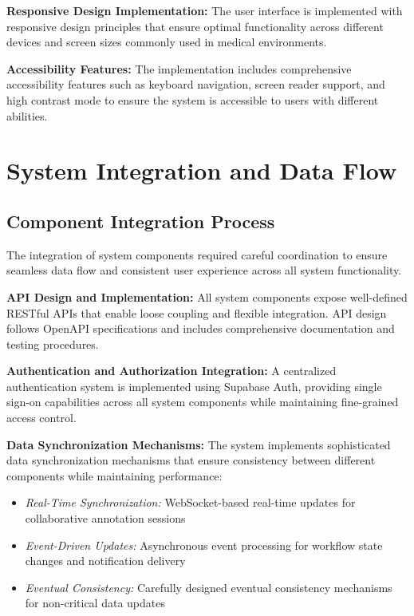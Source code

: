 \textbf{Responsive Design Implementation:} The user interface is implemented with responsive design principles that ensure optimal functionality across different devices and screen sizes commonly used in medical environments.

\textbf{Accessibility Features:} The implementation includes comprehensive accessibility features such as keyboard navigation, screen reader support, and high contrast mode to ensure the system is accessible to users with different abilities.

\section{System Integration and Data Flow}

\subsection{Component Integration Process}

The integration of system components required careful coordination to ensure seamless data flow and consistent user experience across all system functionality.

\textbf{API Design and Implementation:} All system components expose well-defined RESTful APIs that enable loose coupling and flexible integration. API design follows OpenAPI specifications and includes comprehensive documentation and testing procedures.

\textbf{Authentication and Authorization Integration:} A centralized authentication system is implemented using Supabase Auth, providing single sign-on capabilities across all system components while maintaining fine-grained access control.

\textbf{Data Synchronization Mechanisms:} The system implements sophisticated data synchronization mechanisms that ensure consistency between different components while maintaining performance:

\begin{itemize}
    \item \textit{Real-Time Synchronization:} WebSocket-based real-time updates for collaborative annotation sessions
    \item \textit{Event-Driven Updates:} Asynchronous event processing for workflow state changes and notification delivery
    \item \textit{Eventual Consistency:} Carefully designed eventual consistency mechanisms for non-critical data updates
\end{itemize}

